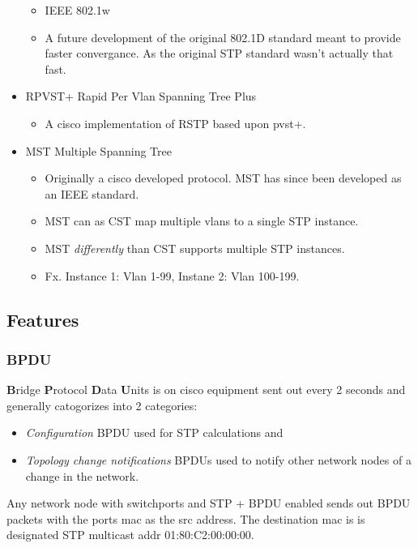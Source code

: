 \begin{itemize}
    \begin{itemize}
        \item IEEE 802.1w
        \item A future development of the original 802.1D standard meant to provide faster convergance. As the original STP standard wasn't actually that fast.
    \end{itemize}
    \item RPVST+ {\scriptsize Rapid Per Vlan Spanning Tree Plus}
    \begin{itemize}
        \item A cisco implementation of RSTP based upon pvst+.
    \end{itemize}
    \item MST {\scriptsize Multiple Spanning Tree}
    \begin{itemize}
        \item Originally a cisco developed protocol. MST has since been developed as an IEEE standard.
        \item MST can as CST map multiple vlans to a single STP instance.
        \item MST \textit{differently} than CST supports multiple STP instances.
        \item Fx. Instance 1: Vlan 1-99, Instane 2: Vlan 100-199.
    \end{itemize}
\end{itemize}

\subsection{Features}

\subsubsection{BPDU}
\textbf{B}ridge \textbf{P}rotocol \textbf{D}ata \textbf{U}nits is on cisco equipment sent out every 2 seconds and generally catogorizes into 2 categories:
\begin{itemize}
    \item \textit{Configuration} BPDU used for STP calculations and
    \item \textit{Topology change notifications} BPDUs used to notify other network nodes of a change in the network.
\end{itemize}

Any network node with switchports and STP + BPDU enabled sends out BPDU packets with the ports mac as the src address. The destination mac is is designated STP multicast addr 01:80:C2:00:00:00.

